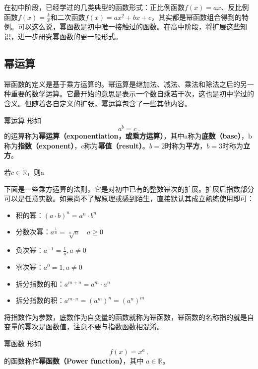 


在初中阶段，已经学过的几类典型的函数形式：正比例函数$f(x) = ax$、反比例函数$\displaystyle f(x) = \frac{k}{x}$和二次函数$f(x) = ax^2+bx+c$，其实都是幂函数组合得到的特例。可以这么说，幂函数是初中唯一接触过的函数。在高中阶段，将扩展这些知识，进一步研究幂函数的更一般形式。

\subsection{幂运算}

幂函数的定义是基于乘方运算的。幂运算是继加法、减法、乘法和除法之后的另一种重要的数学运算。它最开始的意思是表示一个数自乘若干次，这也是初中学过的含义。但随着各自定义的扩张，幂运算包含了一些其他内容。

\begin{definition}{幂运算}\label{def_power_1}
形如
\begin{equation}
a^b=c~.
\end{equation}
的运算称为\textbf{幂运算（exponentiation，或乘方运算）}，其中a称为\textbf{底数（base）}，b称为\textbf{指数（exponent）}，c称为\textbf{幂值（result）}。$b=2$时称为\textbf{平方}，$b=3$时称为\textbf{立方}。

若$c\in \mathbb{R}$，则a
\end{definition}

下面是一些乘方运算的法则，它是对初中已有的整数幂次的扩展。扩展后指数部分可以是任意实数。如果尚不了解原理或感到陌生，直接默认其成立熟练使用即可：
\begin{itemize}
\item 积的幂：$(a \cdot b)^n = a^n \cdot b^n$
\item 分数次幂：$a^{\frac{1}{n}} = \sqrt[n]{a} \quad a \geq 0$
\item 负次幂：$\displaystyle a^{-1}=\frac{1}{a},a\neq0$
\item 零次幂：$a^0=1,a\neq0$
\item 拆分指数的和：$a^{m+n}=a^m \cdot a^n$
\item 拆分指数的积：$a^{m \cdot n}= (a^m)^n =(a^n)^m $
\end{itemize}

将指数作为参数，底数作为自变量的函数就称为幂函数，幂函数的名称指的就是自变量的幂次是函数值，注意不要与指数函数相混淆。

\begin{definition}{幂函数}
形如
\begin{equation}
f(x) = x^a~.
\end{equation}
的函数称作\textbf{幂函数（Power function）}，其中 $a\in\mathbb R$。
\end{definition}

